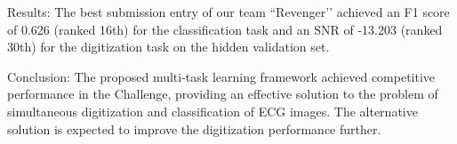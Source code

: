 \documentclass{cinc-abstract}
\newcommand\wordcount{ \currfilepath"}}
\begin{document}
Results: The best submission entry of our team ``Revenger’’ achieved an F1 score of 0.626 (ranked 16th) for the classification task and an SNR of -13.203 (ranked 30th) for the digitization task on the hidden validation set.

Conclusion: The proposed multi-task learning framework achieved competitive performance in the Challenge, providing an effective solution to the problem of simultaneous digitization and classification of ECG images. The alternative solution is expected to improve the digitization performance further.


\end{document}
